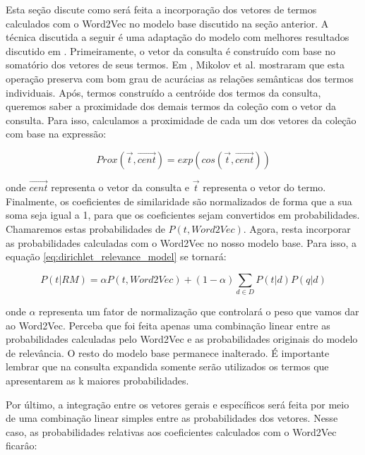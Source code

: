 \documentclass{article}
\begin{document}
Esta seção discute como será feita a incorporação dos vetores de termos calculados com o Word2Vec no modelo base discutido na
seção anterior. A técnica discutida a seguir é uma adaptação do modelo com melhores resultados discutido em \cite{kuzi2016}. 
Primeiramente, o vetor da consulta é construído com base no somatório dos vetores de seus termos. Em \cite{mikolov2013}, Mikolov et al. 
mostraram que esta operação preserva com bom grau de acurácias as relações semânticas dos termos individuais. Após, termos construído
a centróide dos termos da consulta, queremos saber a proximidade dos demais termos da coleção com o vetor da consulta. Para isso, 
calculamos a proximidade de cada um dos vetores da coleção com base na expressão:

\begin{equation}\label{eq:vector_correlation}
Prox(\overrightarrow{t}, \overrightarrow{cent}) = exp(cos(\overrightarrow{t}, \overrightarrow{cent}))
\end{equation}

onde $ \overrightarrow{cent} $ representa o vetor da consulta e $ \overrightarrow{t} $ representa o vetor do termo. Finalmente,
os coeficientes de similaridade são normalizados de forma que a sua soma seja igual a 1, para que os coeficientes sejam convertidos
em probabilidades. Chamaremos estas probabilidades de $ P(t, Word2Vec) $. Agora, resta incorporar as probabilidades calculadas 
com o Word2Vec no nosso modelo base. Para isso, a equação \ref{eq:dirichlet_relevance_model} se tornará:

\begin{equation}\label{eq:lm_with_w2vec}
P(t|RM) = \alpha P(t, Word2Vec) + (1-\alpha) \sum_{d \in D} P(t|d)P(q|d)
\end{equation}

onde $ \alpha $ representa um fator de normalização que controlará o peso que vamos dar ao Word2Vec. Perceba que foi feita apenas 
uma combinação linear entre as probabilidades calculadas pelo Word2Vec e as probabilidades originais do modelo de relevância. O
resto do modelo base permanece inalterado. É importante lembrar que na consulta expandida somente serão utilizados os termos que
apresentarem as k maiores probabilidades.

Por último, a integração entre os vetores gerais e específicos será feita por meio de uma combinação linear simples entre 
as probabilidades dos vetores. Nesse caso, as probabilidades relativas aos coeficientes calculados com o Word2Vec ficarâo:
\end{document}
